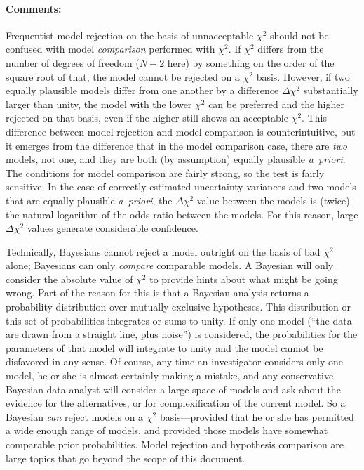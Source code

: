 \documentclass[12pt,twoside]{article}
\newcommand{\notenglish}[1]{\textsl{#1}}
\newcommand{\apriori}{\notenglish{a~priori}}
\newcommand{\documentname}{document}
\newcommand{\commentsname}{Comments}
\newenvironment{comments}{\paragraph{\commentsname:}}{}
\begin{document}
\begin{comments}
Frequentist model rejection on the basis of unnacceptable $\chi^2$
should not be confused with model \emph{comparison} performed with
$\chi^2$.  If $\chi^2$ differs from the number of degrees of freedom
($N-2$ here) by something on the order of the square root of that, the
model cannot be rejected on a $\chi^2$ basis.  However, if two equally
plausible models differ from one another by a difference
$\Delta\chi^2$ substantially larger than unity, the model with the
lower $\chi^2$ can be preferred and the higher rejected on that basis,
even if the higher still shows an acceptable $\chi^2$.  This
difference between model rejection and model comparison is
counterintuitive, but it emerges from the difference that in the model
comparison case, there are \emph{two} models, not one, and they are
both (by assumption) equally plausible \apriori.  The conditions for
model comparison are fairly strong, so the test is fairly sensitive.
In the case of correctly estimated uncertainty variances and two
models that are equally plausible \apriori, the $\Delta\chi^2$ value
between the models is (twice) the natural logarithm of the odds ratio
between the models.  For this reason, large $\Delta\chi^2$ values
generate considerable confidence.

Technically, Bayesians cannot reject a model outright on the basis of
bad $\chi^2$ alone; Bayesians can only \emph{compare} comparable
models.  A Bayesian will only consider the absolute value of $\chi^2$
to provide hints about what might be going wrong.  Part of the reason
for this is that a Bayesian analysis returns a probability
distribution over mutually exclusive hypotheses.  This distribution or
this set of probabilities integrates or sums to unity.  If only one
model (``the data are drawn from a straight line, plus noise'') is
considered, the probabilities for the parameters of that model will
integrate to unity and the model cannot be disfavored in any sense.
Of course, any time an investigator considers only one model, he or
she is almost certainly making a mistake, and any conservative
Bayesian data analyst will consider a large space of models and ask
about the evidence for the alternatives, or for complexification of
the current model.  So a Bayesian \emph{can} reject models on a
$\chi^2$ basis---provided that he or she has permitted a wide enough
range of models, and provided those models have somewhat comparable
prior probabilities.  Model rejection and hypothesis comparison are
large topics that go beyond the scope of this \documentname.


\end{comments}
\end{document}
